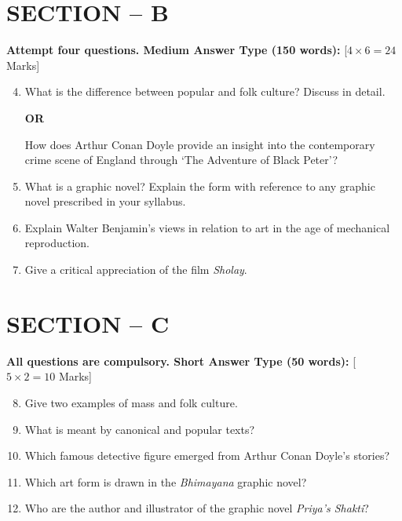 \documentclass[11pt,a4paper]{article}
\begin{document}
\section*{SECTION -- B}



\noindent   \textbf{Attempt four questions. Medium Answer Type (150 words):} \hfill [$4  \times 6 = 24$ Marks]


\begin{enumerate}[label=   \textbf{Q\arabic*.}]
    \setcounter{enumii}{3}
    \item What is the difference between popular and folk culture? Discuss in detail.
    
\begin{center}   \textbf{OR}\end{center}
    How does Arthur Conan Doyle provide an insight into the contemporary crime scene of England through `The Adventure of Black Peter'?

    \item What is a graphic novel? Explain the form with reference to any graphic novel prescribed in your syllabus.

    \item Explain Walter Benjamin's views in relation to art in the age of mechanical reproduction.

    \item Give a critical appreciation of the film   \textit{Sholay}.
\end{enumerate}

\section*{SECTION -- C}



\noindent   \textbf{All questions are compulsory. Short Answer Type (50 words):} \hfill [$5  \times 2 = 10$ Marks]


\begin{enumerate}[label=   \textbf{Q\arabic*.}]
    \setcounter{enumii}{7}
    \item Give two examples of mass and folk culture.
    \item What is meant by canonical and popular texts?
    \item Which famous detective figure emerged from Arthur Conan Doyle's stories?
    \item Which art form is drawn in the   \textit{Bhimayana} graphic novel?
    \item Who are the author and illustrator of the graphic novel   \textit{Priya's Shakti}?
\end{enumerate}
\end{document}
